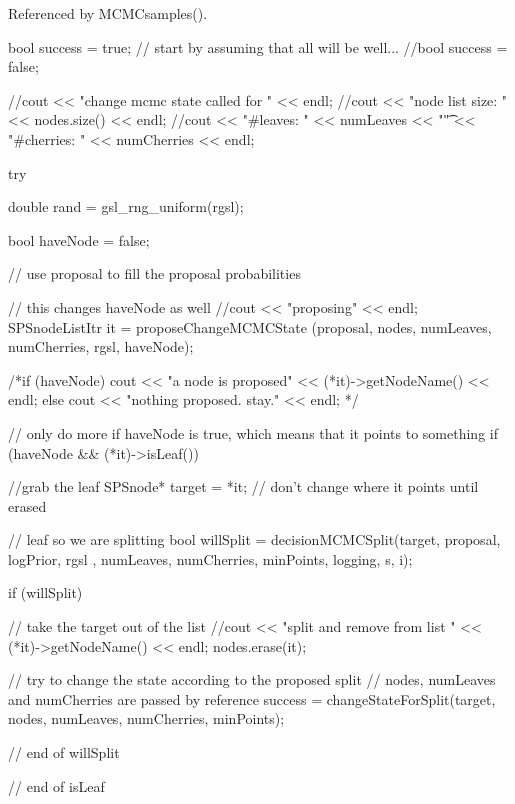 \-Referenced by \-M\-C\-M\-Csamples().


\begin{DoxyCode}
{
    bool success = true; // start by assuming that all will be well...
    //bool success = false;
  
  //cout << "change mcmc state called for " << endl;
  //cout << "node list size: " << nodes.size() << endl;
  //cout << "#leaves: " << numLeaves << "\t" << "#cherries: " << numCherries <<
       endl;

    try {

      double rand = gsl_rng_uniform(rgsl);
        
        bool haveNode = false;

        // use proposal to fill the proposal probabilities

        // this changes haveNode as well
        //cout << "proposing" << endl;
        SPSnodeListItr it = proposeChangeMCMCState (proposal, nodes,
                                numLeaves, numCherries,
                                rgsl, haveNode);
      
      /*if (haveNode) 
      { 
        cout << "a node is proposed"  << (*it)->getNodeName() << endl;
      }
      else {cout << "nothing proposed. stay." << endl;}
      */
      
        // only do more if haveNode is true, which means that it points to
       something
        if (haveNode && (*it)->isLeaf()) {

            //grab the leaf
            SPSnode* target = *it; // don't change where it points until erased


            // leaf so we are splitting
            bool willSplit = decisionMCMCSplit(target, proposal, logPrior, rgsl
      ,
                            numLeaves, numCherries, minPoints,
                            logging, s, i);            

            if (willSplit) {
                // take the target out of the list
          //cout << "split and remove from list " << (*it)->getNodeName() <<
       endl;
               nodes.erase(it);

                // try to change the state according to the proposed split
                // nodes, numLeaves and numCherries are passed by reference
                success = changeStateForSplit(target, nodes,
                            numLeaves, numCherries, minPoints);
            } // end of willSplit

        } // end of isLeaf

}}
\end{DoxyCode}
